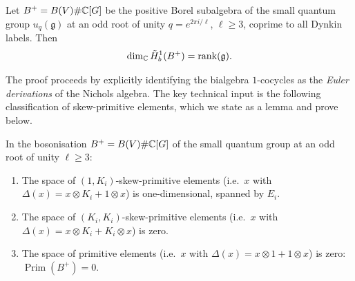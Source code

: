 \begin{theorem}
\label{thm:rank}
Let $B^+ = B(V) \# \mathbb{C}[G]$ be the positive Borel subalgebra of the small quantum group $u_q(\mathfrak{g})$ at an odd root of unity $q = e^{2\pi i/\ell}$, $\ell \geq 3$, coprime to all Dynkin labels. Then
\[
\dim_{\mathbb{C}} \tilde{H}^1_b(B^+) = \operatorname{rank}(\mathfrak{g}).
\]
\end{theorem}

The proof proceeds by explicitly identifying the bialgebra $1$-cocycles as the \emph{Euler derivations} of the Nichols algebra. The key technical input is the following classification of skew-primitive elements, which we state as a lemma and prove below.

\begin{lemma}
\label{lem:skewclass}
In the bosonisation $B^+ = B(V) \# \mathbb{C}[G]$ of the small quantum group at an odd root of unity $\ell \geq 3$:
\begin{enumerate}[label=(\alph*)]
\item The space of $(1, K_i)$-skew-primitive elements (i.e.\ $x$ with $\Delta(x) = x \otimes K_i + 1 \otimes x$) is one-dimensional, spanned by $E_i$.
\item The space of $(K_i, K_i)$-skew-primitive elements (i.e.\ $x$ with $\Delta(x) = x \otimes K_i + K_i \otimes x$) is zero.
\item The space of primitive elements (i.e.\ $x$ with $\Delta(x) = x \otimes 1 + 1 \otimes x$) is zero: $\operatorname{Prim}(B^+) = 0$.
\end{enumerate}
\end{lemma}

